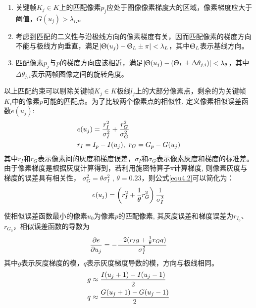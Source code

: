 \begin{enumerate}[label={(\arabic*)}]

\item 关键帧$K_j \in K$上的匹配像素$p_j$应处于图像像素梯度大的区域，像素梯度应大于阈值，$G(u_j)> \lambda_G$。

\item 考虑到匹配的二义性与沿极线方向的像素梯度有关，因而匹配像素的梯度方向不能与极线方向垂直，满足$\vert \Uptheta(u_j)-\Uptheta_L \pm \pi \vert < \lambda_L$，其中$\Uptheta_L$表示基线方向。

\item 匹配像素$p_j$与$p$的梯度方向应该相近，满足$\vert \Uptheta(u_j)-(\Uptheta_L \pm \Delta \theta_{j,i}) \vert < \lambda_\theta $，其中$\Delta \theta_{j,i}$表示两帧图像之间的旋转角度。

\end{enumerate}
以上匹配约束可以剔除关键帧$K_j \in K$极线$l_j$上的大部分像素点，剩余的为关键帧$K_i$中的像素$p$可能的匹配点。为了比较两个像素点的相似性, 定义像素相似误差函数$e(u_j)$:
\begin{equation}
\label{equ4.2}
\begin{aligned}
& e(u_j) = {r_I^2 \over \sigma_I^2} + {r_G^2 \over \sigma_G^2} \\ 
& r_I = I_p-I(u_j),\  r_G = G_p-G(u_j)
\end{aligned}
\end{equation}
其中$r_I$和$r_G$表示像素间的灰度和梯度误差，$\sigma_I$和$\sigma_G$表示像素灰度和梯度的标准差。由于像素梯度是根据灰度计算得到，若利用施密特算子$\triangledown$计算梯度, 则像素灰度与梯度的误差具有相关性，
$\sigma_G^2=\theta \sigma_I^2$ , $ \theta = 0.23$，则公式\eqref{equ4.2}可以简化为：
\begin{equation}
\label{equ4.3}
 e(u_j) = \left( {r_I^2}+{1 \over \theta} r_G^2 \right) {1 \over \sigma_I^2}
\end{equation} 

使相似误差函数最小的像素$u_0$为像素$p$的匹配像素, 其灰度误差和梯度误差为$r_{I_0}$、$r_{G_0}$，相似误差函数的导数为
\begin{equation}
\label{equ4.4}
{\partial e \over \partial u_j } = -{ -2(r_I g+ { 1 \over \theta} r_G q )  \over \sigma_I^2 }
\end{equation}
其中$g$表示灰度梯度的模，$q$表示灰度梯度导数的模，方向与极线相同。
\begin{equation}
\label{equ4.5}
\begin{aligned}
& g \approx { {I(u_j+1) - I(u_j-1)} \over 2 } \\
& q \approx { {G(u_j+1) - G(u_j-1)} \over 2 } 
\end{aligned}
\end{equation}


